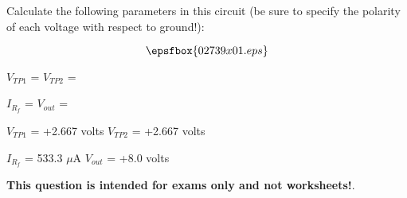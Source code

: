 

Calculate the following parameters in this circuit (be sure to specify the polarity of each voltage with respect to ground!):

$$\epsfbox{02739x01.eps}$$

$V_{TP1}$ = \hskip 80pt $V_{TP2}$ =

\vskip 10pt

$I_{R_f}$ = \hskip 80pt $V_{out}$ =







$V_{TP1}$ = +2.667 volts \hskip 50pt $V_{TP2}$ = +2.667 volts

\vskip 10pt

$I_{R_f}$ = 533.3 $\mu$A \hskip 50pt $V_{out}$ = +8.0 volts







{\bf This question is intended for exams only and not worksheets!}.




